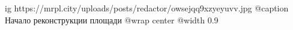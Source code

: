  
 
 
 
 

\ifcmt
  ig https://mrpl.city/uploads/posts/redactor/owsejqq9xzyeyuvv.jpg
	@caption Начало реконструкции площади
  @wrap center
  @width 0.9
\fi
